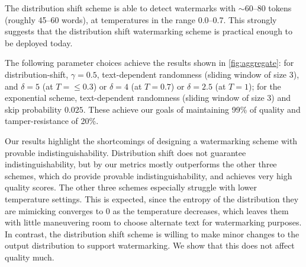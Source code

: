 \smallskip{} 
The distribution shift scheme is able to detect watermarks with
$\sim$60--80 tokens (roughly 45--60 words), at temperatures in the
range 0.0--0.7.
This strongly suggests that the distribution shift watermarking scheme
is practical enough to be deployed today.

\smallskip{} 
The following parameter choices achieve the results shown in \cref{fig:aggregate}: for distribution-shift, 
$\gamma=0.5$, text-dependent randomness (sliding window of size 3), and $\delta=5$ (at $T=\leq0.3$) or 
$\delta=4$ (at $T=0.7$) or $\delta=2.5$ (at $T=1$);
for the exponential scheme, text-dependent randomness (sliding window of size 3) and skip probability $0.025$.
These achieve our goals of maintaining 99\% of quality and tamper-resistance of 20\%.






\smallskip{}
%
Our results highlight the shortcomings of designing a watermarking scheme with provable indistinguishability.
Distribution shift does not guarantee indistinguishability, but by our metrics mostly outperforms the other three schemes, 
which do provide provable indistinguishability, and achieves very high quality scores.
The other three schemes especially struggle with lower temperature settings. 
This is expected, since the entropy of the distribution they are mimicking converges to 0 as the temperature decreases, 
which leaves them with little maneuvering room to choose alternate text for watermarking purposes.
In contrast, the distribution shift scheme is willing to make minor changes to the output distribution to support watermarking.
We show that this does not affect quality much.

